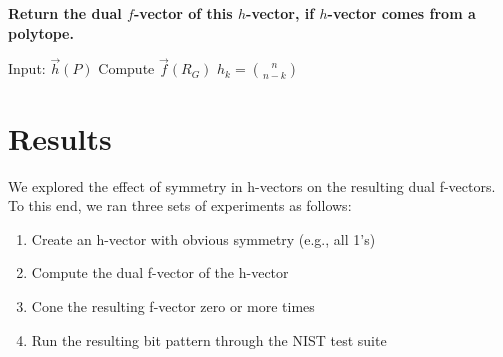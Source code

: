\documentclass[oneside,12pt]{amsart}
\theoremstyle{definition}
\numberwithin{equation}{section}
\begin{document}
\vspace{.5in}

\begin{center}
\textbf{Return the dual $f$-vector of this $h$-vector, if $h$-vector comes from a polytope.}
\end{center}

\vspace{.1in}


\begin{algorithmic}
\State Input: $\overrightarrow{h}(P)$
\State Compute $\overrightarrow{f}(R_G)$
\State    $h_k = {n \choose n-k}$
\Else
{}%
\EndIf
\EndFor
\EndFor
\end{algorithmic}




\newpage
\section{Results} \label{results}



We explored the effect of symmetry in h-vectors on the resulting dual f-vectors. To this end, we ran three sets of experiments as follows: 
\begin{enumerate}
\item Create an h-vector with obvious symmetry (e.g., all 1's)
\item Compute the dual f-vector of the h-vector
\item Cone the resulting f-vector zero or more times
\item Run the resulting bit pattern through the NIST test suite
\end{enumerate}
\end{document}
